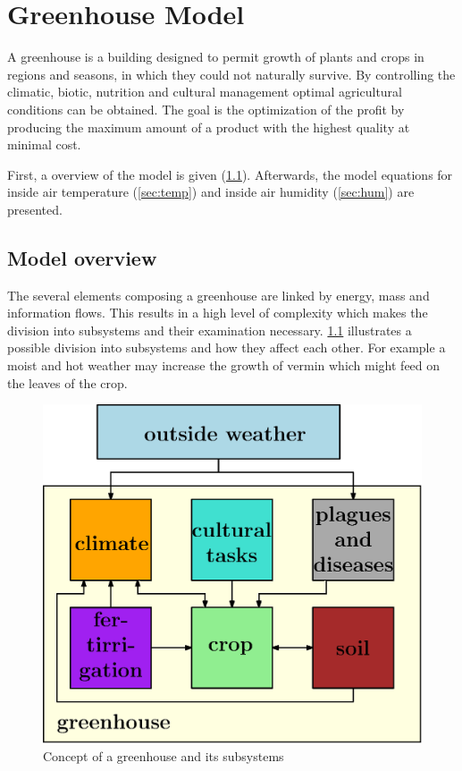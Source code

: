 \chapter{Greenhouse Model}
\label{cha:greenhousemodel}

A greenhouse is a building designed to permit growth of plants and crops in regions and seasons, in which they could not naturally survive. By controlling the climatic, biotic, nutrition and cultural management optimal agricultural conditions can be obtained. The goal is the optimization of the profit by producing the maximum amount of a product with the highest quality at minimal cost.

First, a overview of the model is given (\cref{sec:model_overview}).
Afterwards, the model equations for inside air temperature (\cref{sec:temp}) and inside air humidity (\cref{sec:hum}) are presented.

\section{Model overview}
\label{sec:model_overview}

The several elements composing a greenhouse are linked by energy, mass and information flows.
This results in a high level of complexity which makes the division into subsystems and their examination necessary.
\cref{fig:greenhouse_subsystems} illustrates a possible division into subsystems and how they affect each other.
For example a moist and hot weather may increase the growth of vermin which might feed on the leaves of the crop.

\begin{figure}[t]
\begin{center}
\includegraphics[width=.7\textwidth]{../Figures/subsystems.eps}
\caption{Concept of a greenhouse and its subsystems}
\label{fig:greenhouse_subsystems}
\end{center}
\end{figure}

